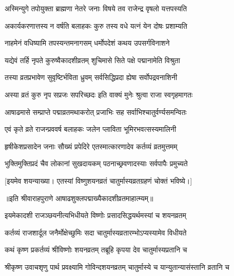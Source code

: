 \twolineshloka
{अस्मिन्युगे तपोयुक्ता ब्राह्मणा नेतरे जनाः}
{विषये तव राजेन्द्र वृषलो यत्तपस्यति} %

\twolineshloka
{अकार्यकरणात्तस्य न वर्षति बलाहकः}
{कुरु तस्य वधे यत्नं येन दोषः प्रशाम्यति} %


\twolineshloka
{नाहमेनं वधिष्यामि तपस्यन्तमनागसम्}
{धर्मोपदेशं कथय उपसर्गविनाशने} %


\twolineshloka
{यद्येवं तर्हि नृपते कुरुष्वैकादशीव्रतम्}
{शुचिमासे सिते पक्षे पद्मानामेति विश्रुता} %

\twolineshloka
{तस्या व्रतप्रभावेण सुवृष्टिर्भविता ध्रुवम्}
{सर्वसिद्धिप्रदा ह्येषा सर्वोपद्रवनाशिनी} %

\twolineshloka
{अस्या व्रतं कुरु नृप सप्रजः सपरिच्छदः}
{इति वाक्यं मुनेः श्रुत्वा राजा स्वगृहमागतः} %

\twolineshloka
{आषाढमासे सम्प्राप्ते पद्माव्रतमथाकरोत्}
{प्रजाभिः सह सर्वाभिश्चातुर्वर्ण्यसमन्वितः} %

\twolineshloka
{एवं कृते व्रते राजन्प्रववर्ष बलाहकः}
{जलेन प्लाविता भूमिरभवत्सस्यमालिनी} %

\twolineshloka
{हृषीकेशप्रसादेन जनाः सौख्यं प्रपेदिरे}
{एतस्मात्कारणादेव कर्तव्यं व्रतमुत्तमम्} %

\twolineshloka
{भुक्तिमुक्तिप्रदं चैव लोकानां सुखदायकम्}
{पठनाच्छ्रवणादस्याः सर्वपापैः प्रमुच्यते} %

[इयमेव शयन्याख्या। एतस्यां विष्णुशयनव्रतं चातुर्मास्यव्रतग्रहणं चोक्तं भविष्ये।]

॥इति श्रीवाराहपुराणे आषाढशुक्लपद्माख्यैकादशीव्रतमाहात्म्यम्॥


\hyperref[sec:ekadashi_mahatmyam_vrata_raja]{\closesub}
\clearpage

\label{sec:vrata-raja-ashadha-shukla-shayani-bhavishya}


\twolineshloka
{इयमेकादशी राजञ्छयनीत्यभिधीयते}
{विष्णोः प्रसादसिद्धयर्थमस्यां च शयनव्रतम्} %

\twolineshloka
{कर्तव्यं राजशार्दूल जनैर्मोक्षेच्छुमिः सदा}
{चातुर्मास्यव्रतारम्भोऽप्यस्यामेव विधीयते} %


\twolineshloka
{कथं कृष्ण प्रकर्तव्यं श्रीविष्णोः शयनव्रतम्}
{तब्रूहि कृपया देव चातुर्मास्यप्रतानि च} %

\twolineshloka
{श्रीकृष्ण उवाचशृणु पार्थ प्रवक्ष्यामि गोविन्दशयनव्रतम्}
{चातुर्मास्ये च यान्युतान्यासंस्तानि व्रतानि च} %

